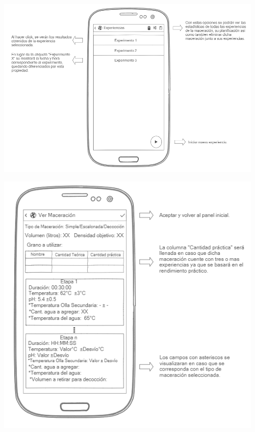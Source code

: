     \begin{minipage}{0.95\textwidth}

        \centering
        \includegraphics[scale=0.55]{Anexo/MockUp/ExperimentActivity.jpg}
        \label{fig:MockUpExperimentActivity}
    \end{minipage}
    
    \begin{minipage}{0.95\textwidth}

        \centering
        \includegraphics[scale=0.7]{Anexo/MockUp/InfoMash.jpg}
        \label{fig:MockUpInfoMash}
    \end{minipage}
    
